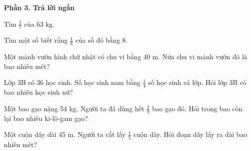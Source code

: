 \textbf{Phần 3. Trả lời ngắn}

\begin{ex} %
Tìm $\frac{1}{7}$ của $63\text{ kg}$.
\end{ex}

\begin{ex} %
Tìm một số biết rằng $\frac{1}{6}$ của số đó bằng 8.
\end{ex}

\begin{ex} %
Một mảnh vườn hình chữ nhật có chu vi bằng $40\text{ m}$. Nửa chu vi mảnh vườn đó là bao nhiêu mét?
\end{ex}

\begin{ex} %
Lớp 3B có 36 học sinh. Số học sinh nam bằng $\frac{1}{4}$ số học sinh cả lớp. Hỏi lớp 3B có bao nhiêu học sinh nữ?
\end{ex}

\begin{ex} %
Một bao gạo nặng 54 kg. Người ta đã dùng hết $\frac{1}{9}$ bao gạo đó. Hỏi trong bao còn lại bao nhiêu ki-lô-gam gạo?
\end{ex}

\begin{ex} %
Một cuộn dây dài 45 m. Người ta cắt lấy $\frac{1}{5}$ cuộn dây. Hỏi đoạn dây lấy ra dài bao nhiêu mét?
\end{ex}
